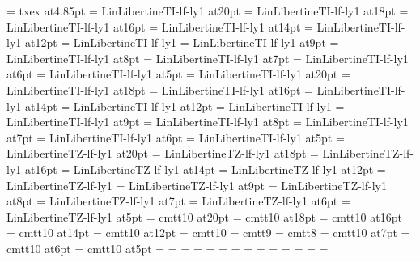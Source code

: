 \font\fiveex=        txex at4.85pt
%
\font\twentyit=     LinLibertineTI-lf-ly1 at20pt
\font\eighteenit=   LinLibertineTI-lf-ly1 at18pt
\font\sixteenit=    LinLibertineTI-lf-ly1 at16pt
\font\fourteenit=   LinLibertineTI-lf-ly1 at14pt
\font\twelveit=     LinLibertineTI-lf-ly1 at12pt
\font\tenit=        LinLibertineTI-lf-ly1
\font\nineit=       LinLibertineTI-lf-ly1 at9pt
\font\eightit=      LinLibertineTI-lf-ly1 at8pt
\font\sevenit=      LinLibertineTI-lf-ly1 at7pt
\font\sixit=        LinLibertineTI-lf-ly1 at6pt
\font\fiveit=       LinLibertineTI-lf-ly1 at5pt
%
\font\twentysl=     LinLibertineTI-lf-ly1 at20pt
\font\eighteensl=   LinLibertineTI-lf-ly1 at18pt
\font\sixteensl=    LinLibertineTI-lf-ly1 at16pt
\font\fourteensl=   LinLibertineTI-lf-ly1 at14pt
\font\twelvesl=     LinLibertineTI-lf-ly1 at12pt
\font\tensl=        LinLibertineTI-lf-ly1
\font\ninesl=       LinLibertineTI-lf-ly1 at9pt
\font\eightsl=      LinLibertineTI-lf-ly1 at8pt
\font\sevensl=      LinLibertineTI-lf-ly1 at7pt
\font\sixsl=        LinLibertineTI-lf-ly1 at6pt
\font\fivesl=       LinLibertineTI-lf-ly1 at5pt
%
\font\twentybf=     LinLibertineTZ-lf-ly1 at20pt
\font\eighteenbf=   LinLibertineTZ-lf-ly1 at18pt
\font\sixteenbf=    LinLibertineTZ-lf-ly1 at16pt
\font\fourteenbf=   LinLibertineTZ-lf-ly1 at14pt
\font\twelvebf=     LinLibertineTZ-lf-ly1 at12pt
\font\tenbf=        LinLibertineTZ-lf-ly1
\font\ninebf=       LinLibertineTZ-lf-ly1 at9pt
\font\eightbf=      LinLibertineTZ-lf-ly1 at8pt
\font\sevenbf=      LinLibertineTZ-lf-ly1 at7pt
\font\sixbf=        LinLibertineTZ-lf-ly1 at6pt
\font\fivebf=       LinLibertineTZ-lf-ly1 at5pt
%
\font\twentytt=     cmtt10 at20pt
\font\eighteentt=   cmtt10 at18pt
\font\sixteentt=    cmtt10 at16pt
\font\fourteentt=   cmtt10 at14pt
\font\twelvett=     cmtt10 at12pt
\font\tentt=        cmtt10
\font\ninett=       cmtt9
\font\eighttt=      cmtt8
\font\seventt=      cmtt10 at7pt
\font\sixtt=        cmtt10 at6pt
\font\fivett=       cmtt10 at5pt
%
=\tenrm
{}=\sevenrm
{}=\fiverm
\def\rm{\fam=0 \tenrm}%
%
=\teni
{}=\seveni
{}=\fivei
\def\mit{\fam=1}%
%
=\tensy
{}=\sevensy
{}=\fivesy
\def\cal{\fam=2}%
%
=\tenex
{}=\sevenex
{}=\fiveex
%
\def\it{\fam=\itfam \tenit}%
\textfont\itfam=\tenit
\scriptfont\itfam=\sevenit
